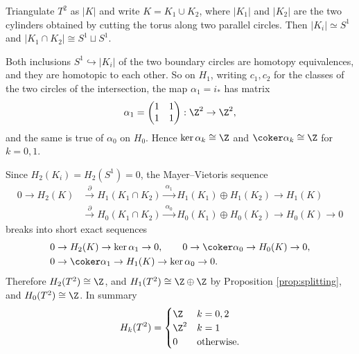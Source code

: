 \begin{example} \label{ex:torus-homology}
	Triangulate $T^2$ as $|K|$ and write $K = K_1 \cup K_2$, where $|K_1|$ and $|K_2|$ are the two cylinders obtained by cutting the torus along two parallel circles. Then $|K_i|\simeq S^1$ and $|K_1\cap K_2| \cong S^1 \sqcup S^1$.

	Both inclusions $S^1 \hookrightarrow |K_i|$ of the two boundary circles are homotopy equivalences, and they are homotopic to each other. So on $H_1$, writing $c_1, c_2$ for the classes of the two circles of the intersection, the map $\alpha_1 = i_*$ has matrix
	$$
	\alpha_1 = \begin{pmatrix}1&1\\1&1\end{pmatrix}: \Z^2 \to \Z^2 ,
	$$
	and the same is true of $\alpha_0$ on $H_0$. Hence $\ker\alpha_k \cong \Z$ and $\coker\alpha_k\cong\Z$ for $k = 0,1$.

	Since $H_2(K_i) = H_2(S^1) = 0$, the Mayer--Vietoris sequence
	\begin{align*}
		0 \to H_2(K) &\xrightarrow{\ \partial\ } H_1(K_1\cap K_2) \xrightarrow{\ \alpha_1\ } H_1(K_1)\oplus H_1(K_2) \to H_1(K)\\
		&\xrightarrow{\ \partial\ } H_0(K_1\cap K_2) \xrightarrow{\ \alpha_0\ } H_0(K_1)\oplus H_0(K_2) \to H_0(K) \to 0
	\end{align*}
	breaks into short exact sequences
	\begin{align*}
		&0 \to H_2(K)\to\ker\alpha_1\to 0, \qquad 0\to\coker\alpha_0\to H_0(K)\to0,\\
		&0 \to \coker\alpha_1 \to H_1(K)\to\ker\alpha_0\to0.
	\end{align*}
	Therefore $H_2(T^2)\cong\Z$, and $H_1(T^2)\cong\Z\oplus\Z$ by Proposition \ref{prop:splitting}, and $H_0(T^2)\cong\Z$. In summary
	$$
	H_k(T^2) = \begin{cases}\Z & k = 0,2\\ \Z^2 & k=1\\ 0&\text{otherwise.}\end{cases}
	$$
\end{example}

\begin{center}
\end{center}

